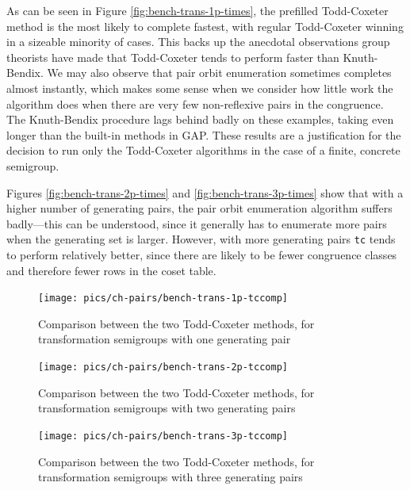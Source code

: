 As can be seen in Figure \ref{fig:bench-trans-1p-times}, the prefilled Todd-Coxeter
method is the most likely to complete fastest, with regular Todd-Coxeter winning
in a sizeable minority of cases.  This backs up the anecdotal observations group
theorists have made \cite{havascomparing} that Todd-Coxeter tends to perform
faster than Knuth-Bendix.  We may also observe that pair orbit enumeration
sometimes completes almost instantly, which makes some sense when we consider
how little work the algorithm does when there are very few non-reflexive pairs
in the congruence.  The Knuth-Bendix procedure lags behind badly on these
examples, taking even longer than the built-in methods in GAP.  These results
are a justification for the decision to run only the Todd-Coxeter algorithms in
the case of a finite, concrete semigroup.

Figures \ref{fig:bench-trans-2p-times} and \ref{fig:bench-trans-3p-times} show
that with a higher number of generating pairs, the pair orbit enumeration
algorithm suffers badly---this can be understood, since it generally has to
enumerate more pairs when the generating set is larger.  However, with more
generating pairs \texttt{tc} tends to perform relatively better, since there are
likely to be fewer congruence classes and therefore fewer rows in the coset
table.

\begin{figure}[h]
  \centering
  \texttt{[image: pics/ch-pairs/bench-trans-1p-tccomp]}
  \caption{Comparison between the two Todd-Coxeter methods, for transformation
    semigroups with one generating pair}
  \label{fig:bench-trans-1p-tccomp}
\end{figure}

\begin{figure}[h]
  \centering
  \texttt{[image: pics/ch-pairs/bench-trans-2p-tccomp]}
  \caption{Comparison between the two Todd-Coxeter methods, for transformation
    semigroups with two generating pairs}
  \label{fig:bench-trans-2p-tccomp}
\end{figure}

\begin{figure}[h]
  \centering
  \texttt{[image: pics/ch-pairs/bench-trans-3p-tccomp]}
  \caption{Comparison between the two Todd-Coxeter methods, for transformation
    semigroups with three generating pairs}
  \label{fig:bench-trans-3p-tccomp}
\end{figure}

